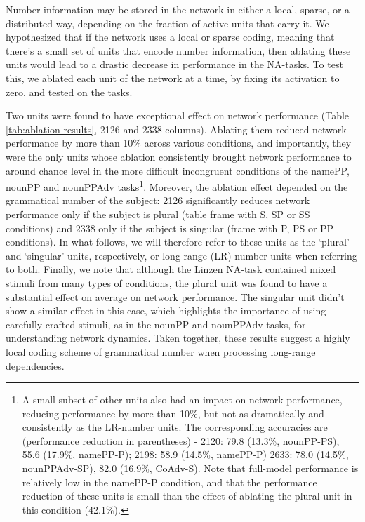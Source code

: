 Number information may be stored in the network in either a local,
sparse, or a distributed way, depending on the fraction of active
units that carry it.  We hypothesized that if the network uses a local
or sparse coding, meaning that there's a small set of units that
encode number information, then ablating these units would lead to a
drastic decrease in performance in the NA-tasks.  To test this, we
ablated each unit of the network at a time, by fixing its activation
to zero, and tested on the tasks.

Two units were found to have exceptional effect on network performance
(Table \ref{tab:ablation-results}, \unit{2}{126} and \unit{2}{338}
columns). Ablating them reduced network performance by more than 10\%
across various conditions, and importantly, they were the only units
whose ablation consistently brought network performance to around
chance level in the more difficult incongruent conditions of the
namePP, nounPP and nounPPAdv tasks\footnote{A small subset of other units
also had an impact on network performance, reducing performance by more than 10\%, but not as dramatically and consistently as the LR-number units. The corresponding accuracies are (performance reduction in parentheses) - \unit{2}{120}: 79.8 (13.3\%, nounPP-PS), 55.6 (17.9\%, namePP-P); \unit{2}{198}: 58.9 (14.5\%, namePP-P) \unit{2}{633}: 78.0 (14.5\%, nounPPAdv-SP), 82.0 (16.9\%, CoAdv-S). Note that full-model performance is relatively low in the namePP-P condition, and that the performance reduction of these units is small than the effect of ablating the plural unit in this condition (42.1\%).}. Moreover, the ablation effect depended on the grammatical number of the subject: \unit{2}{126} significantly reduces
network performance only if the subject is plural (table frame with S, SP or SS conditions) and \unit{2}{338}
only if the subject is singular (frame with P, PS or PP conditions). In what follows, we will therefore
refer to these units as the `plural' and `singular' units, respectively,
or long-range (LR) number units when referring to both. Finally, we note that although the Linzen NA-task contained mixed stimuli from many types of conditions, the plural unit was found to have a substantial effect on average on network performance. The singular unit didn't show a similar effect in this case, which highlights the importance of using carefully crafted stimuli, as in the nounPP and nounPPAdv tasks, for understanding network dynamics. Taken
together, these results suggest a highly local coding scheme of
grammatical number when processing long-range dependencies.

